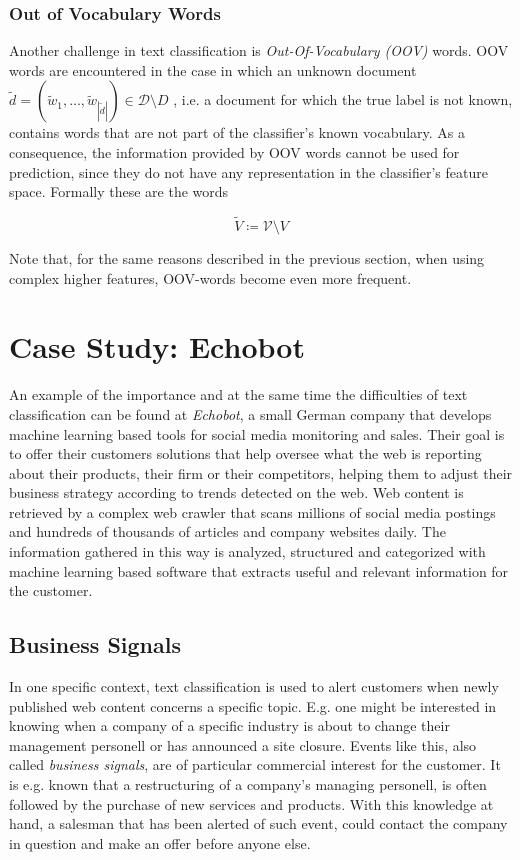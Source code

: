 \subsubsection{Out of Vocabulary Words}
\label{ssec:oov}

Another challenge in text classification is \emph{Out-Of-Vocabulary
(OOV)} words. OOV words are encountered in the case in which an unknown document
$\tilde{d} = (\tilde{w}_1, \ldots, \tilde{w}_{|\tilde{d}|}) \in
\mathcal{D}\setminus D$ , i.e.
a document for which the true label is not known, contains words that are not
part of the classifier's known vocabulary.
As a consequence, the information provided by OOV words cannot be used for
prediction, since they do not have any representation in the classifier's feature 
space. Formally these are the words

\begin{equation*}
\tilde{V} \coloneqq \mathcal{V} \setminus V
\end{equation*}

Note that, for the same reasons described in the previous section, when using
complex higher features, OOV-words become even more frequent. 

\section{Case Study: Echobot}
\label{sec:echobot}
An example of the importance and at the same time the difficulties of text
classification can be found at \textit{Echobot}, a small
German company that develops machine learning based tools for social media
monitoring and sales. Their goal is to offer their customers solutions that
help oversee what the web is reporting about their products, their firm or
their competitors, helping them to adjust their business strategy according 
to trends detected on the web. Web content is retrieved by a complex web crawler
that scans millions of social media postings and hundreds of thousands
of articles and company websites daily. The information gathered in this way is
analyzed, structured and categorized with machine learning based software that
extracts useful and relevant information for the customer.

\subsection{Business Signals}

In one specific context, text classification is used to alert customers when
newly published web content concerns a specific topic. E.g. one might
be interested in knowing when a company of a specific industry is about to change
their management personell or has announced a site closure. 
Events like this, also called \textit{business signals}, are of particular
commercial interest for the customer. It is e.g. known that a restructuring 
of a company's managing personell, is often followed by the purchase of new
services and products. With this knowledge at hand, a salesman that has been
alerted of such event, could contact the company in question and make an offer
before anyone else.

